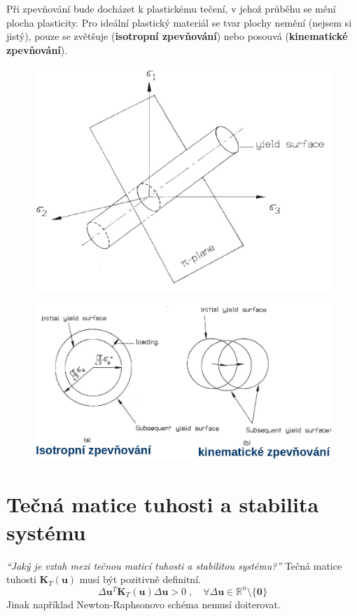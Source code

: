 \documentclass{article}
\begin{document}
\begin{multicols}{2}
	Při zpevňování bude docházet k plastickému tečení, v jehož průběhu se mění plocha plasticity. Pro ideální plastický materiál se tvar plochy nemění (nejsem si jistý), pouze se zvětšuje (\textbf{isotropní zpevňování}) nebo posouvá (\textbf{kinematické zpevňování}).
	\begin{figure}[H]
		\centering
		\includegraphics[width=.6\linewidth]{figs/PlochaPlasticity.png}
	\end{figure}
	\begin{figure}[H]
		\centering
		\includegraphics[width=.8\linewidth]{figs/Zpevnovani.png}
	\end{figure}
	

	\vfill\null
	\columnbreak


	\section{Tečná matice tuhosti a stabilita systému}
	\emph{``Jaký je vztah mezi tečnou maticí tuhosti a stabilitou systému?''}
	Tečná matice tuhosti $\bm{K}_T(\bm{u})$ musí být pozitivně definitní.
	\begin{equation*}
		\Delta\bm{u}^T\bm{K}_T(\bm{u})\Delta\bm{u} > 0
		\;,\quad
		\forall \Delta\bm{u} \in \mathbb{R}^n \setminus \{\bm{0}\}
	\end{equation*}
	Jinak například Newton-Raphsonovo schéma nemusí doiterovat.


\end{multicols}
\end{document}
